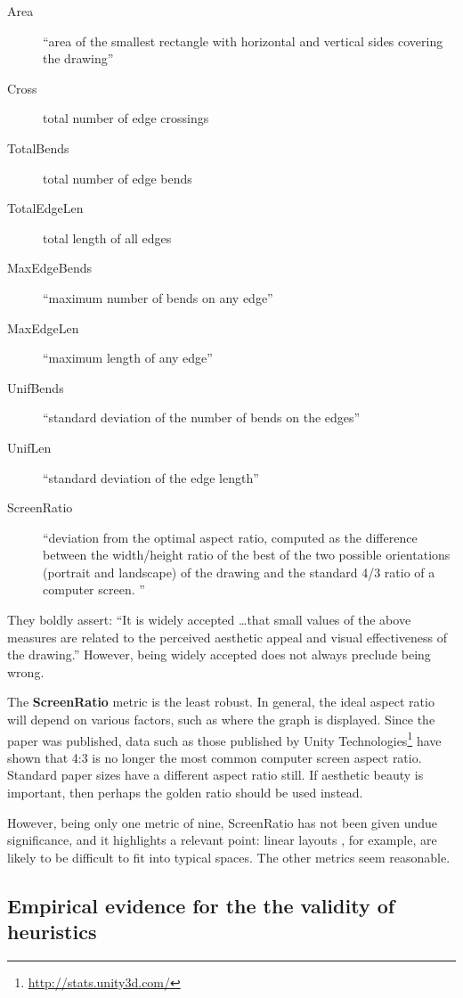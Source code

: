\begin{description}
    \item[Area]
``area of the smallest rectangle with horizontal and vertical sides covering the drawing''
    \item[Cross]
total number of edge crossings
    \item[TotalBends]
total number of edge bends
    \item[TotalEdgeLen]
total length of all edges
    \item[MaxEdgeBends]
``maximum number of bends on any edge''
    \item[MaxEdgeLen]
``maximum length of any edge''
    \item[UnifBends]
``standard deviation of the number of bends on the edges''
    \item[UnifLen]
``standard deviation of the edge length''
    \item[ScreenRatio]
``deviation from the optimal aspect ratio, computed as the difference between the width/height ratio of the best of the two possible orientations (portrait and landscape) of the drawing and the standard 4/3 ratio of a computer screen. ''
\end{description}

They boldly assert: ``It is widely accepted \ldots that small values of the above measures are related to the perceived aesthetic appeal and visual effectiveness of the drawing.''
However, being widely accepted does not always preclude being wrong.

The \textbf{ScreenRatio} metric is the least robust.
In general, the ideal aspect ratio will depend on various factors, such as where the graph is displayed.
Since the paper was published, data such as those published by Unity Technologies\footnote{\url{http://stats.unity3d.com/}} have shown that 4:3 is no longer the most common computer screen aspect ratio.
Standard paper sizes have a different aspect ratio still.
If aesthetic beauty is important, then perhaps the golden ratio  should be used instead.

However, being only one metric of nine, ScreenRatio has not been given undue significance, and it highlights a relevant point: linear layouts , for example, are likely to be difficult to fit into typical spaces.
The other metrics seem reasonable.


\subsection{Empirical evidence for the the validity of heuristics}

